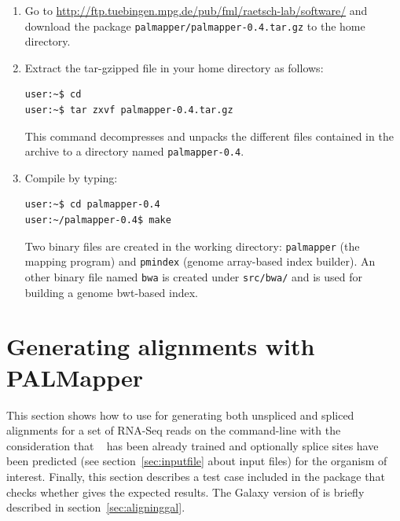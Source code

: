 \documentclass{article}
\begin{document}
\begin{enumerate}
\item Go to \url{http://ftp.tuebingen.mpg.de/pub/fml/raetsch-lab/software/}
    and download the package \texttt{palmapper/palmapper-0.4.tar.gz}
    to the home directory. 

\item Extract the tar-gzipped file in your home directory as follows:
\begin{verbatim}user:~$ cd
user:~$ tar zxvf palmapper-0.4.tar.gz\end{verbatim}
This command decompresses and unpacks the different files contained in
the archive to a directory named \texttt{palmapper-0.4}.

\item Compile \PALMapper{} by typing:
\begin{verbatim}user:~$ cd palmapper-0.4
user:~/palmapper-0.4$ make\end{verbatim}
Two binary files are created in the working directory: \texttt{palmapper} (the
mapping program) and \texttt{pmindex} (genome array-based index
builder). An other binary file named \texttt{bwa} is created under
\texttt{src/bwa/} and is used for building a genome bwt-based index.
\end{enumerate}

\section{Generating alignments with PALMapper}
\label{sec:aligning}

This section shows how to use \PALMapper{} for generating both unspliced
and spliced alignments for a set of RNA-Seq reads on the
command-line with the consideration that \QP{}~\cite{DeBona08} has
been already trained and optionally splice sites have been predicted
(see section~\ref{sec:inputfile} about input files) for the organism
of interest. Finally, this section describes a test case included in
the package that checks whether \PALMapper{} gives the expected
results. The Galaxy version of \PALMapper{} is briefly described in
section~\ref{sec:aligninggal}. 
\end{document}
